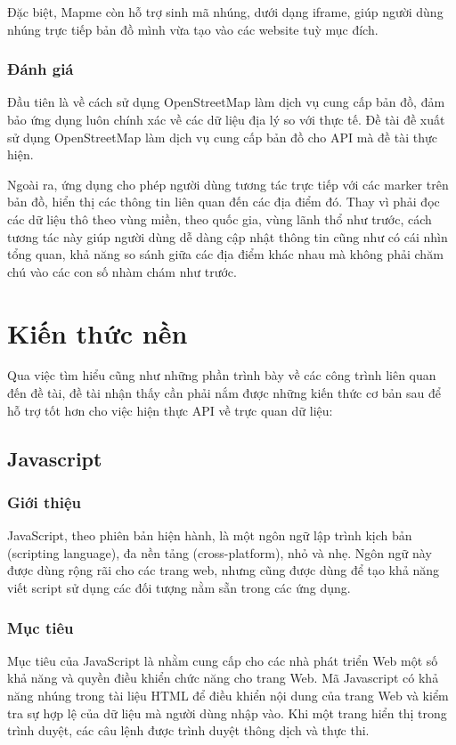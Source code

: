\documentclass[12pt,a4paper,oneside]{article}
\begin{document}
Đặc biệt, Mapme còn hỗ trợ sinh mã nhúng, dưới dạng iframe, giúp người dùng nhúng trực tiếp bản đồ mình vừa tạo vào các website tuỳ mục đích.

\subsubsection{Đánh giá}
Đầu tiên là về cách sử dụng OpenStreetMap làm dịch vụ cung cấp bản đồ, đảm bảo ứng dụng luôn chính xác về các dữ liệu địa lý so với thực tế. Đề tài đề xuất sử dụng OpenStreetMap làm dịch vụ cung cấp bản đồ cho API mà đề tài thực hiện.

Ngoài ra, ứng dụng cho phép người dùng tương tác trực tiếp với các marker trên bản đồ, hiển thị các thông tin liên quan đến các địa điểm đó. Thay vì phải đọc các dữ liệu thô theo vùng miền, theo quốc gia, vùng lãnh thổ như trước, cách tương tác này giúp người dùng dễ dàng cập nhật thông tin cũng như có cái nhìn tổng quan, khả năng so sánh giữa các địa điểm khác nhau mà không phải chăm chú vào các con số nhàm chám như trước.

\section{Kiến thức nền}
Qua việc tìm hiểu cũng như những phần trình bày về các công trình liên quan đến đề tài, đề tài nhận thấy cần phải nắm được những kiến thức cơ bản sau để hỗ trợ tốt hơn cho việc hiện thực API về trực quan dữ liệu:
\subsection{Javascript}
\subsubsection{Giới thiệu}
JavaScript, theo phiên bản hiện hành, là một ngôn ngữ lập trình kịch bản (scripting language), đa nền tảng (cross-platform), nhỏ và nhẹ. Ngôn ngữ này được dùng rộng rãi cho các trang web, nhưng cũng được dùng để tạo khả năng viết script sử dụng các đối tượng nằm sẵn trong các ứng dụng.

\subsubsection{Mục tiêu}
Mục tiêu của JavaScript là nhằm cung cấp cho các nhà phát triển Web một số khả năng và quyền điều khiển chức năng cho trang Web. Mã Javascript có khả năng nhúng trong tài liệu HTML để điều khiển nội dung của trang Web và kiểm tra sự hợp lệ của dữ liệu mà người dùng nhập vào. Khi một trang hiển thị trong trình duyệt, các câu lệnh được trình duyệt thông dịch và thực thi.
\end{document}

